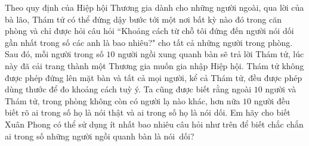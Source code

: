 \begin{multicols}{2}
\begin{figure}[H]
		\vspace*{-15pt}
	\end{figure}
	Theo quy định của Hiệp hội Thương gia dành cho những người ngoài, qua lời của bà lão, Thám tử có thể đứng dậy bước tới một nơi bất kỳ nào đó trong căn phòng và chỉ được hỏi câu hỏi ``Khoảng cách từ chỗ tôi đứng đến người nói dối gần nhất trong số các anh là bao nhiêu?" cho tất cả những người trong phòng. Sau đó, mỗi người trong số $10$ người ngồi xung quanh bàn sẽ trả lời Thám tử, lúc này đã cải trang thành một Thương gia muốn gia nhập Hiệp hội. Thám tử không được phép đứng lên mặt bàn và tất cả mọi người, kể cả Thám tử, đều được phép dùng thước để đo khoảng cách tuỳ ý. Ta cũng được biết rằng ngoài $10$ người và Thám tử, trong phòng không còn có người lạ nào khác, hơn nữa $10$ người đều biết rõ ai trong số họ là nói thật và ai trong số họ là nói dối. Em hãy cho biết Xuân Phong có thể sử dụng ít nhất bao nhiêu câu hỏi như trên để biết chắc chắn ai trong số những người ngồi quanh bàn là nói~dối?
\end{multicols}
\newpage
\begingroup
{} 
\centering
\endgroup
\vspace*{35pt}

